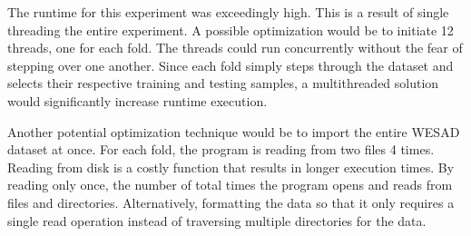 The runtime for this experiment was exceedingly high. This is a result of single threading 
the entire experiment. A possible optimization would be to initiate 12 threads, one for 
each fold. The threads could run concurrently without the fear of stepping over one another. 
Since each fold simply steps through the dataset and selects their respective training and 
testing samples, a multithreaded solution would significantly increase runtime execution. 

Another potential optimization technique would be to import the entire WESAD dataset 
at once. For each fold, the program is reading from two files 4 times. Reading from disk 
is a costly function that results in longer execution times. By reading only once, the number 
of total times the program opens and reads from files and directories. Alternatively, 
formatting the data so that it only requires a single read operation instead of traversing 
multiple directories for the data.
